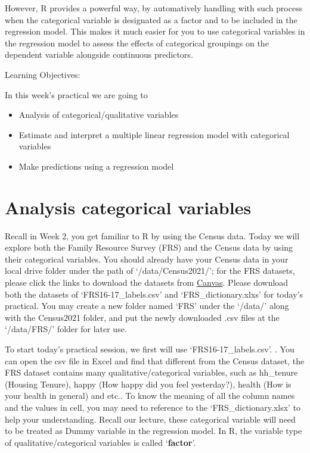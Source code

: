 \documentclass[
  letterpaper,
  DIV=11,
  numbers=noendperiod]{scrreprt}
\begin{document}
However, R provides a powerful way, by automatively handling with such
process when the categorical variable is designated as a factor and to
be included in the regression model. This makes it much easier for you
to use categorical variables in the regression model to assess the
effects of categorical groupings on the dependent variable alongside
continuous predictors.

Learning Objectives:

In this week's practical we are going to

\begin{itemize}
\item
  Analysis of categorical/qualitative variables
\item
  Estimate and interpret a multiple linear regression model with
  categorical variables
\item
  Make predictions using a regression model
\end{itemize}

\section{Analysis categorical
variables}\label{analysis-categorical-variables}

Recall in Week 2, you get familiar to R by using the Census data. Today
we will explore both the Family Resource Survey (FRS) and the Census
data by using their categorical variables. You should already have your
Census data in your local drive folder under the path of
`/data/Census2021/'; for the FRS datasets, please click the links to
download the datasets from
\href{https://canvas.liverpool.ac.uk/courses/84668/pages/family-resource-survey-2016-17?module_item_id=2396198}{Canvas}.
Please download both the datasets of `FRS16-17\_labels.csv' and
`FRS\_dictionary.xlxs' for today's practical. You may create a new
folder named `FRS' under the `/data/' along with the Census2021 folder,
and put the newly downloaded .csv files at the `/data/FRS/' folder for
later use.

To start today's practical session, we first will use
`FRS16-17\_labels.csv'. . You can open the csv file in Excel and find
that different from the Census dataset, the FRS dataset contains many
qualitative/categorical variables, such as hh\_tenure (Housing Tenure),
happy (How happy did you feel yesterday?), health (How is your health in
general) and etc.. To know the meaning of all the column names and the
values in cell, you may need to reference to the `FRS\_dictionary.xlsx'
to help your understanding. Recall our lecture, these categorical
variable will need to be treated as Dummy variable in the regression
model. In R, the variable type of qualitative/categorical variables is
called `\textbf{factor}'.
\end{document}
